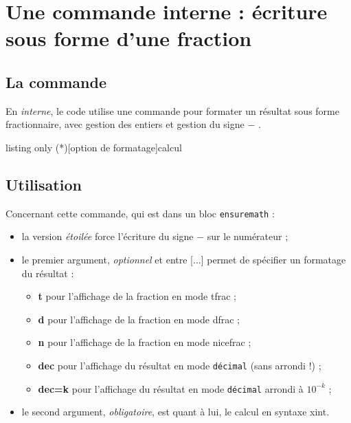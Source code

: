 \documentclass[french,a4paper,11pt]{article}
\newcommand\Cle[1]{{\bfseries\sffamily\textlangle #1\textrangle}}
\newcommand\cmaj[1]{\tcbox[vignetteMaJ]{#1}\xspace}
\begin{document}
\section{Une commande interne : écriture sous forme d'une fraction}

\subsection{La commande}

\begin{cautionblock}
En \textit{interne}, le code utilise une commande pour formater un résultat sous forme fractionnaire, avec gestion des entiers et gestion du signe \og $-$ \fg.
\end{cautionblock}

\begin{PresentationCode}{listing only}
\ConvVersFrac(*)[option de formatage]{calcul}
\end{PresentationCode}

\subsection{Utilisation}

\begin{tipblock}
Concernant cette commande, qui est dans un bloc \texttt{ensuremath} :

\begin{itemize}
	\item \cmaj{0.1.3} la version \textit{étoilée} force l'écriture du signe \og $-$ \fg{} sur le numérateur ;
	\item le premier argument, \textit{optionnel} et entre \textsf{[...]} permet de spécifier un formatage du résultat :
	\begin{itemize}
		\item \Cle{t} pour l'affichage de la fraction en mode \textsf{tfrac} ;
		\item \Cle{d} pour l'affichage de la fraction en mode \textsf{dfrac} ;
		\item \Cle{n} pour l'affichage de la fraction en mode \textsf{nicefrac} ;
		\item \Cle{dec} pour l'affichage du résultat en mode \texttt{décimal} (sans arrondi !) ;
		\item \Cle{dec=k} pour l'affichage du résultat en mode \texttt{décimal} arrondi à $10^{-k}$ ;
	\end{itemize}
	\item le second argument, \textit{obligatoire}, est quant à lui, le calcul en syntaxe \textsf{xint}.
\end{itemize}
\vspace*{-\baselineskip}\leavevmode
\end{tipblock}
\end{document}
